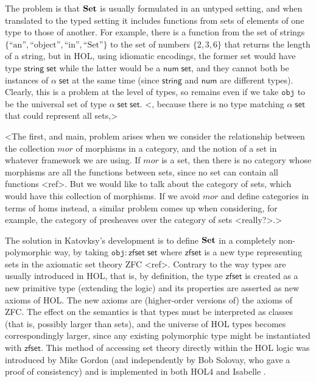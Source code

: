 \documentclass[twoside,titlepage,11pt]{article}
\begin{document}
The problem is that $\mathbf{Set}$ is usually formulated in an untyped setting, and when translated to the typed setting it includes functions from sets of elements of one type to those of another.
For example, there is a function from the set of strings $\{\text{``an''},\text{``object''},\text{``in''},\text{``Set''}\}$ to the set of numbers $\{2,3,6\}$ that returns the length of a string, but in HOL, using idiomatic encodings, the former set would have type $\mathsf{string}\;\mathsf{set}$ while the latter would be a $\mathsf{num}\;\mathsf{set}$, and they cannot both be instances of $\alpha\;\mathsf{set}$ at the same time (since $\mathsf{string}$ and $\mathsf{num}$ are different types).
Clearly, this is a problem at the level of types, so remains even if we take $\mathtt{obj}$ to be the universal set of type $\alpha\;\mathsf{set}\;\mathsf{set}$.
<, because there is no type matching $\alpha\;\mathsf{set}$ that could represent all sets,>

<The first, and main, problem arises when we consider the relationship between the collection $mor$ of morphisms in a category, and the notion of a set in whatever framework we are using.
If $mor$ is a set, then there is no category whose morphisms are all the functions between sets, since no set can contain all functions <ref>.
But we would like to talk about the category of sets, which would have this collection of morphisms.
If we avoid $mor$ and define categories in terms of homs instead, a similar problem comes up when considering, for example, the category of presheaves over the category of sets <really?>.>

The solution in Katovksy's development is to define $\mathbf{Set}$ in a completely non-polymorphic way, by taking $\mathtt{obj}:\mathsf{zfset}\;\mathsf{set}$ where $\mathsf{zfset}$ is a new type representing sets in the axiomatic set theory ZFC <ref>.
Contrary to the way types are usually introduced in HOL, that is, by definition, the type $\mathsf{zfset}$ is created as a new primitive type (extending the logic) and its properties are asserted as new axioms of HOL.
The new axioms are (higher-order versions of) the axioms of ZFC.
The effect on the semantics is that types must be interpreted as classes (that is, possibly larger than sets), and the universe of HOL types becomes correspondingly larger, since any existing polymorphic type might be instantiated with $\mathsf{zfset}$.
This method of accessing set theory directly within the HOL logic was introduced by Mike Gordon \cite{DBLP:conf/tphol/Gordon96} (and independently by Bob Solovay, who gave a proof of consistency) and is implemented in both HOL4 and Isabelle \cite{DBLP:conf/ictac/Obua06}.
\end{document}
